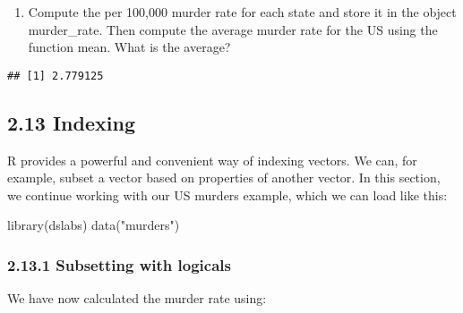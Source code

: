 \documentclass[
]{article}
\newenvironment{Shaded}{\begin{snugshade}}{\end{snugshade}}
\newcommand{\DecValTok}[1]{\textcolor[rgb]{0.00,0.00,0.81}{#1}}
\newcommand{\FunctionTok}[1]{\textcolor[rgb]{0.00,0.00,0.00}{#1}}
\newcommand{\NormalTok}[1]{#1}
\newcommand{\OtherTok}[1]{\textcolor[rgb]{0.56,0.35,0.01}{#1}}
\newcommand{\SpecialCharTok}[1]{\textcolor[rgb]{0.00,0.00,0.00}{#1}}
\newcommand{\StringTok}[1]{\textcolor[rgb]{0.31,0.60,0.02}{#1}}
\providecommand{\tightlist}{%
  \setlength{\itemsep}{0pt}\setlength{\parskip}{0pt}}
\begin{document}
\begin{enumerate}
\def\labelenumi{\arabic{enumi}.}
\setcounter{enumi}{2}
\tightlist
\item
  Compute the per 100,000 murder rate for each state and store it in the
  object murder\_rate. Then compute the average murder rate for the US
  using the function mean. What is the average?
\end{enumerate}

\begin{Shaded}
\end{Shaded}

\begin{verbatim}
## [1] 2.779125
\end{verbatim}

\hypertarget{indexing}{%
\subsection{2.13 Indexing}\label{indexing}}

R provides a powerful and convenient way of indexing vectors. We can,
for example, subset a vector based on properties of another vector. In
this section, we continue working with our US murders example, which we
can load like this:

\begin{Shaded}
\begin{Highlighting}[]
\FunctionTok{library}\NormalTok{(dslabs)}
\FunctionTok{data}\NormalTok{(}\StringTok{"murders"}\NormalTok{)}
\end{Highlighting}
\end{Shaded}

\hypertarget{subsetting-with-logicals}{%
\subsubsection{2.13.1 Subsetting with
logicals}\label{subsetting-with-logicals}}

We have now calculated the murder rate using:

\begin{Shaded}
\end{Shaded}
\end{document}
